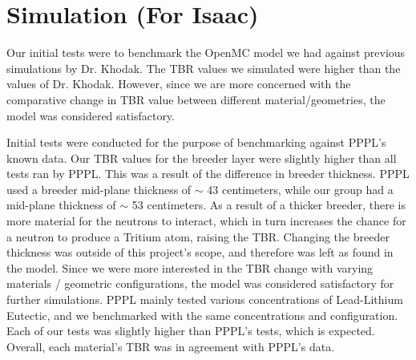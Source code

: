 \documentclass{article}
\begin{document}
\section*{Simulation (For Isaac)}

Our initial tests were to benchmark the OpenMC model we had against previous simulations by Dr. Khodak. The TBR values we simulated were higher than the values of Dr. Khodak. However, since we are more concerned with the comparative change in TBR value between different material/geometries, the model was considered satisfactory. 

\bigskip

Initial tests were conducted for the purpose of benchmarking against PPPL's known data. Our TBR values for the breeder layer were slightly higher than all tests ran by PPPL. This was a result of the difference in breeder thickness. PPPL used a breeder mid-plane thickness of $\sim$ 43 centimeters, while our group had a mid-plane thickness of $\sim$ 53 centimeters. As a result of a thicker breeder, there is more material for the neutrons to interact, which in turn increases the chance for a neutron to produce a Tritium atom, raising the TBR. Changing the breeder thickness was outside of this project's scope, and therefore was left as found in the model. Since we were more interested in the TBR change with varying materials / geometric configurations, the model was considered satisfactory for further simulations. PPPL mainly tested various concentrations of Lead-Lithium Eutectic, and we benchmarked with the same concentrations and configuration. Each of our tests was slightly higher than PPPL's tests, which is expected. Overall, each material's TBR was in agreement with PPPL's data. 
\end{document}
